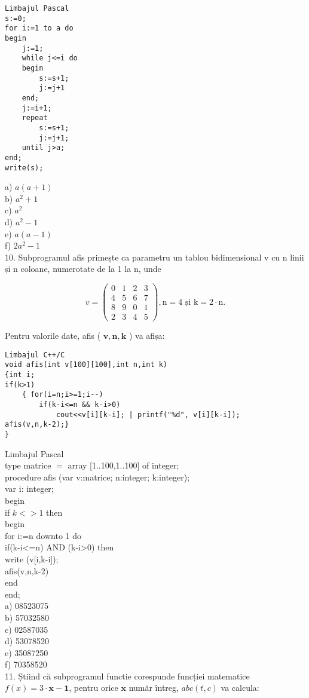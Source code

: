 \begin{verbatim}
Limbajul Pascal
s:=0;
for i:=1 to a do
begin
    j:=1;
    while j<=i do
    begin
        s:=s+1;
        j:=j+1
    end;
    j:=i+1;
    repeat
        s:=s+1;
        j:=j+1;
    until j>a;
end;
write(s);
\end{verbatim}

a) $a(a+1)$\\
b) $a^{2}+1$\\
c) $a^{2}$\\
d) $a^{2}-1$\\
e) $a(a-1)$\\
f) $2 a^{2}-1$\\
10. Subprogramul afis primește ca parametru un tablou bidimensional v cu n linii și n coloane, numerotate de la 1 la n, unde

$$
v=\left(\begin{array}{llll}
0 & 1 & 2 & 3 \\
4 & 5 & 6 & 7 \\
8 & 9 & 0 & 1 \\
2 & 3 & 4 & 5
\end{array}\right), \mathrm{n}=4 \text { și } \mathrm{k}=2 \cdot \mathrm{n} .
$$

Pentru valorile date, afis ( $\mathbf{v}, \mathbf{n}, \mathbf{k}$ ) va afișa:

\begin{verbatim}
Limbajul C++/C
void afis(int v[100][100],int n,int k)
{int i;
if(k>1)
    { for(i=n;i>=1;i--)
        if(k-i<=n && k-i>0)
            cout<<v[i][k-i]; | printf("%d", v[i][k-i]);
afis(v,n,k-2);}
}
\end{verbatim}

Limbajul Pascal\\
type matrice $=$ array [1..100,1..100] of integer;\\
procedure afis (var v:matrice; n:integer; k:integer);\\
var i: integer;\\
begin\\
if $k<>1$ then\\
begin\\
for i:=n downto 1 do\\
if(k-i<=n) AND (k-i>0) then\\[0pt]
write (v[i,k-i]);\\
afis(v,n,k-2)\\
end\\
end;\\
a) 08523075\\
b) 57032580\\
c) 02587035\\
d) 53078520\\
e) 35087250\\
f) 70358520\\
11. Știind că subprogramul functie corespunde funcției matematice $f(x)=3 \cdot \mathbf{x - 1}$, pentru orice $\mathbf{x}$ număr întreg, $a b c(t, c)$ va calcula:

